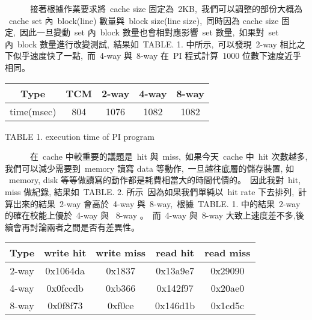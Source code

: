 \documentclass{article}
\begin{document}
\begin{CJK*}{UTF8}{bsmi}
\begin{multicols}{2}
\begin{flushleft}
    \ \ \ \ \ \ 接著根據作業要求將\ cache size 固定為\ 2KB,\
    我們可以調整的部份大概為 \ cache set 內\ block(line) 數量與\ block size(line size),\
    同時因為 cache size 固定,\
    因此一旦變動\ set 內\ block 數量也會相對應影響\ set 數量,\
    如果對\ set 內\ block 數量進行改變測試,\
    結果如\ TABLE. 1. 中所示,\
    可以發現\ 2-way 相比之下似乎速度快了一點,\
    而\ 4-way 與\ 8-way 在\ PI 程式計算\ 1000 位數下速度近乎相同。\
\end{flushleft}

\begin{center}
    \begin{tabular}{||c c c c c ||} 
     \hline
     Type & TCM & 2-way & 4-way & 8-way \\ [2ex] 
     \hline\hline
     time(msec) & 804 & 1076  & 1082 & 1082 \\ 
     \hline
    \end{tabular}
\end{center}

\begin{center}
    \small{TABLE 1. execution time of PI program}\\
\end{center}

\begin{flushleft}
    \ \ \ \ \ \ 在\ cache 中較重要的議題是\ hit 與\ miss,\
    如果今天\ cache 中\ hit 次數越多, 我們可以減少需要到\ memory 讀寫 data 等動作,\
    一旦越往底層的儲存裝置, 如 \ memory, disk 等等做讀寫的動作都是耗費相當大的時間代價的。\
    因此我對\ hit, miss 做紀錄, 結果如\ TABLE. 2. 所示\
    因為如果我們單純以\ hit rate 下去排列,\
    計算出來的結果\ 2-way 會高於\ 4-way 與\ 8-way,\
    根據\ TABLE. 1. 中的結果\ 2-way 的確在校能上優於\ 4-way 與 \ 8-way 。\
    而\ 4-way 與\ 8-way 大致上速度差不多,後續會再討論兩者之間是否有差異性。
\end{flushleft}

\begin{center}
    \begin{tabular}{||c c c c c ||} 
     \hline
     Type & write hit & write miss & read hit & read miss \\ [2ex] 
     \hline\hline
     2-way & 0x1064da & 0x1837 & 0x13a9e7 & 0x29090  \\ 
     \hline
     4-way & 0x0fccdb & 0xb366 & 0x142f97 & 0x20ae0  \\ 
     \hline
     8-way & 0x0f8f73 & 0xf0ce & 0x146d1b & 0x1cd5c  \\ 
     \hline
    \end{tabular}
\end{center}


\end{multicols}
\end{CJK*}
\end{document}

